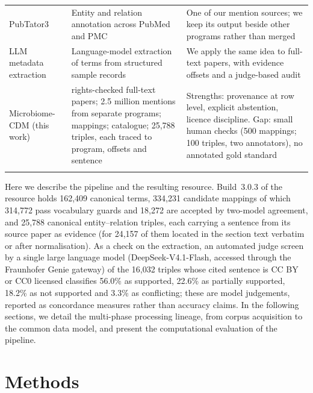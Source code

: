 \documentclass[referee,lineno,pdflatex,sn-vancouver-num]{sn-jnl}
\theoremstyle{thmstyleone}%
\theoremstyle{thmstyletwo}%
\theoremstyle{thmstylethree}%
\begin{document}
\begin{table}[!t]
\begin{tabular}{@{}>{\raggedright\arraybackslash}p{}>{\raggedright\arraybackslash}p{}>{\raggedright\arraybackslash}p{}@{}}
PubTator3~\cite{wei2024pubtator3} & Entity and relation annotation across PubMed and PMC & One of our mention sources; we keep its output beside other programs rather than merged \\
LLM metadata extraction~\cite{ikeda2025biosample} & Language-model extraction of terms from structured sample records & We apply the same idea to full-text papers, with evidence offsets and a judge-based audit \\
\midrule
Microbiome-CDM (this work) & 453 rights-checked full-text papers; 2.5 million mentions from separate programs; mappings; catalogue; 25,788 triples, each traced to program, offsets and sentence & Strengths: provenance at row level, explicit abstention, licence discipline. Gap: small human checks (500 mappings; 100 triples, two annotators), no annotated gold standard \\
\botrule
\end{tabular}
\end{table}

Here we describe the pipeline and the resulting resource. Build~3.0.3 of the
resource holds
162,409 canonical terms, 334,231 candidate mappings of which 314,772 pass
vocabulary guards and 18,272 are accepted by two-model agreement, and 25,788
canonical entity--relation triples, each carrying a sentence from its
source paper as evidence (for 24,157 of them located in the section text
verbatim or after normalisation). As a check on the extraction, an automated judge
screen by a single large language model (DeepSeek-V4.1-Flash, accessed through
the Fraunhofer Genie gateway) of the 16,032 triples whose cited sentence is CC BY
or CC0 licensed
classifies 56.0\% as supported, 22.6\% as partially supported, 18.2\% as not
supported and 3.3\% as conflicting; these are model judgements, reported as
concordance measures rather than accuracy claims. In the following sections, we
detail the multi-phase processing lineage, from corpus acquisition to the
common data model, and present the computational evaluation of the pipeline.

\section{Methods}\label{sec:methods}
\end{document}
